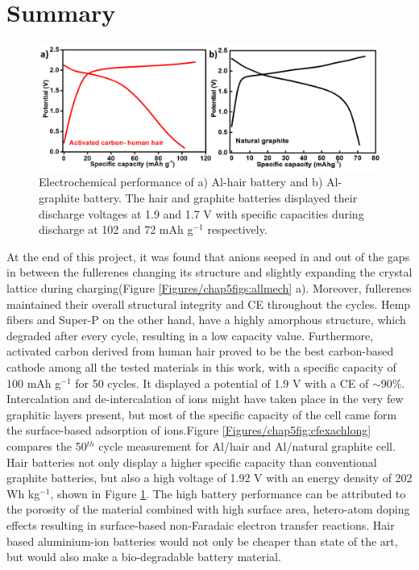 \section{Summary}
\begin{figure}[h]
\centering
\includegraphics[width=\textwidth]{Figures/chap5fig/hairgraph}
\caption{Electrochemical performance of a) Al-hair battery and b) Al-graphite battery. The hair and graphite batteries displayed their discharge voltages at 1.9 and 1.7 V with specific capacities during discharge at 102 and 72 mAh g$^{-1}$ respectively.}
 \label{Figures/chap5fig:hairgraph}
\end{figure}
At the end of this project, it was found that  anions seeped in and out of the gaps in between the fullerenes changing its structure and slightly expanding the crystal lattice during charging(Figure \ref{Figures/chap5figs:allmech} a). Moreover, fullerenes maintained their overall structural integrity and CE throughout the cycles. Hemp fibers and Super-P on the other hand, have a highly amorphous structure, which degraded after every cycle, resulting in a low capacity value. Furthermore, activated carbon derived from human hair proved to be the best carbon-based cathode among all the tested materials in this work, with a specific capacity of 100 mAh g$^{-1}$ for 50 cycles. It displayed a potential of 1.9 V with a CE of $\sim$90$\%$. Intercalation and de-intercalation of  ions might have taken place in the very few graphitic layers present, but most of the specific capacity of the cell came form the surface-based adsorption of ions.Figure \ref{Figures/chap5fig:cfexachlong} compares the 50$^{th}$ cycle measurement for Al/hair and Al/natural graphite cell. Hair batteries not only display a higher specific capacity than conventional graphite batteries, but also a high voltage of 1.92 V with an energy density of 202 Wh kg$^{-1}$, shown in Figure \ref{Figures/chap5fig:hairgraph}. The high battery performance can be attributed to the porosity of the material combined with high surface area, hetero-atom doping effects resulting in surface-based non-Faradaic electron transfer reactions. Hair based aluminium-ion batteries would not only be cheaper than state of the art, but would also make a bio-degradable battery material.
\newpage
